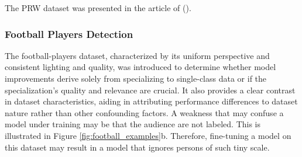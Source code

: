 The PRW dataset was presented in the article of \citeauthor{zheng2017person} (\citeyear{zheng2017person}).

\newpage
\subsubsection{Football Players Detection}
The football-players dataset, characterized by its uniform perspective and consistent lighting and quality, was introduced to determine whether model improvements derive solely from specializing to single-class data or if the specialization's quality and relevance are crucial. It also provides a clear contrast in dataset characteristics, aiding in attributing performance differences to dataset nature rather than other confounding factors. A weakness that may confuse a model under training may be that the audience are not labeled. This is illustrated in Figure \ref{fig:football_examples}b. Therefore, fine-tuning a model on this dataset may result in a model that ignores persons of such tiny scale. 

